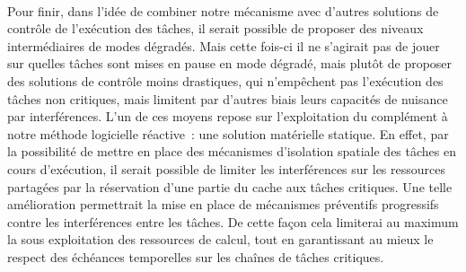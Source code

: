 \documentclass[a4paper,11pt,twoside]{StyleThese}
\begin{document}
\paragraph*{} Pour finir, dans l'idée de combiner notre mécanisme avec d'autres solutions de contrôle de l'exécution des tâches, il serait possible de proposer des niveaux intermédiaires de modes dégradés. Mais cette fois-ci il ne s'agirait pas de jouer sur quelles tâches sont mises en pause en mode dégradé, mais plutôt de proposer des solutions de contrôle moins drastiques, qui n'empêchent pas l'exécution des tâches non critiques, mais limitent par d'autres biais leurs capacités de nuisance par interférences. L'un de ces moyens repose sur l'exploitation du complément à notre méthode logicielle réactive~: une solution matérielle statique. En effet, par la possibilité de mettre en place des mécanismes d'isolation spatiale des tâches en cours d'exécution, il serait possible de limiter les interférences sur les ressources partagées par la réservation d'une partie du cache aux tâches critiques. Une telle amélioration permettrait la mise en place de mécanismes préventifs progressifs contre les interférences entre les tâches. De cette façon cela limiterai au maximum la sous exploitation des ressources de calcul, tout en garantissant au mieux le respect des échéances temporelles sur les chaînes de tâches critiques. 

\ifdefined{}
\else


\end{document}
